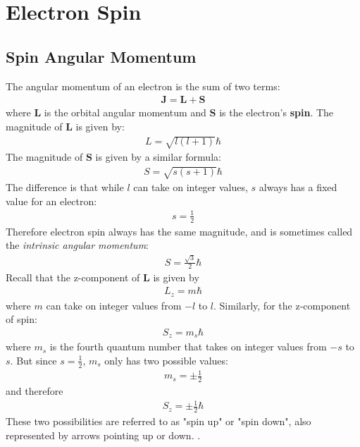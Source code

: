 \documentclass[10pt]{article}
\begin{document}
\section{Electron Spin}

\subsection{Spin Angular Momentum}
The angular momentum of an electron is the sum of two terms:
    \begin{align}
        \mathbf{J} = \mathbf{L} + \mathbf{S}        
    \end{align}
where $\mathbf{L}$ is the orbital angular momentum and $\mathbf{S}$ is the electron's \textbf{spin}. The magnitude of $\mathbf{L}$ is given by:
\begin{align}
     L = \sqrt{l(l+1)}\hbar
\end{align}
The magnitude of $\mathbf{S}$ is given by a similar formula:
\begin{align}
    S = \sqrt{s(s+1)}\hbar
\end{align}
The difference is that while $l$ can take on integer values, $s$ always has a fixed value for an electron: 
\begin{align}
    s = \frac{1}{2}    
\end{align}
Therefore electron spin always has the same magnitude, and is sometimes called the \textit{intrinsic angular momentum}:
\begin{align}
    S = \frac{\sqrt{3}}{2}\hbar 
\end{align}
Recall that the z-component of $\mathbf{L}$ is given by
\begin{align}
    L_z = m\hbar
\end{align}
where $m$ can take on integer values from $-l$ to $l$. Similarly, for the z-component of spin: 
\begin{align}
    S_z = m_s\hbar    
\end{align}
where $m_s$ is the fourth quantum number that takes on integer values from $-s$ to $s$. But since $s = \frac{1}{2}$, $m_s$ only has two possible values:
\begin{align}
    m_s = \pm \frac{1}{2}
\end{align}
and therefore
\begin{align}
    S_z = \pm \frac{1}{2}\hbar
\end{align}
These two possibilities are referred to as "spin up" or "spin down", also represented by arrows pointing up or down. .
\end{document}
